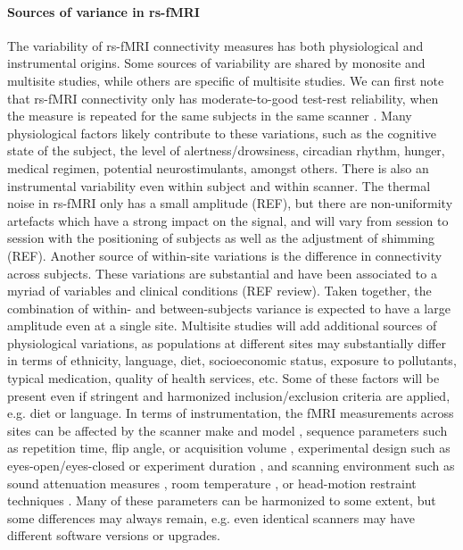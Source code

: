 \documentclass[authoryear]{elsarticle}
\begin{document}
\paragraph{Sources of variance in rs-fMRI}
The variability of rs-fMRI connectivity measures has both physiological and instrumental origins. Some sources of variability are shared by monosite and multisite studies, while others are specific of multisite studies. We can first note that rs-fMRI connectivity only has moderate-to-good test-rest reliability, when the measure is repeated for the same subjects in the same scanner \citep{Shehzad2009}. Many physiological factors likely contribute to these variations, such as the cognitive state of the subject, the level of alertness/drowsiness, circadian rhythm, hunger, medical regimen, potential neurostimulants, amongst others. There is also an instrumental variability even within subject and within scanner. The thermal noise in rs-fMRI only has a small amplitude (REF), but there are non-uniformity artefacts which have a strong impact on the signal, and will vary from session to session with the positioning of subjects as well as the adjustment of shimming (REF). Another source of within-site variations is the difference in connectivity across subjects. These variations are substantial and have been associated to a myriad of variables and clinical conditions (REF review). Taken together, the combination of within- and between-subjects variance is expected to have a large amplitude even at a single site. Multisite studies will add additional sources of physiological variations, as populations at different sites may substantially differ in terms of ethnicity, language, diet, socioeconomic status, exposure to pollutants, typical medication, quality of health services, etc. Some of these factors will be present even if stringent and harmonized inclusion/exclusion criteria are applied, e.g. diet or language. In terms of instrumentation, the fMRI measurements across sites can be affected by the scanner make and model \citep{Friedman2006}, sequence parameters such as repetition time, flip angle, or acquisition volume \citep{Friedman2006a}, experimental design such as eyes-open/eyes-closed \citep{Yan2009} or experiment duration \citep{VanDijk2010}, and scanning environment such as sound attenuation measures \citep{Elliott1999}, room temperature \citep{Vanhoutte2006}, or head-motion restraint techniques \citep{Edward2000}. Many of these parameters can be harmonized to some extent, but some differences may always remain, e.g. even identical scanners may have different software versions or upgrades.
\end{document}
